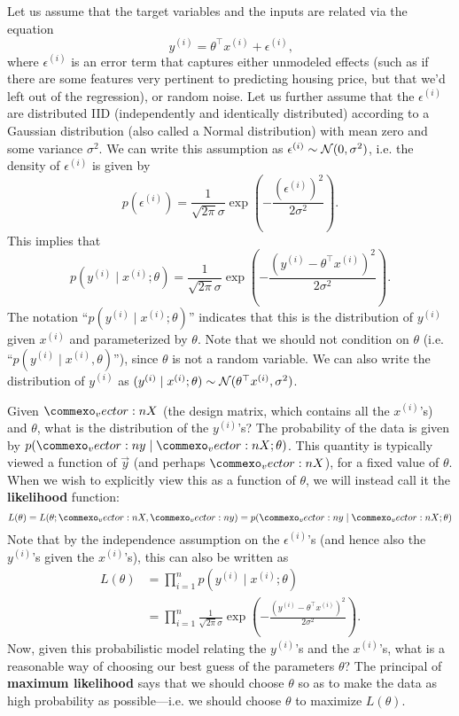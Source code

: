 Let us assume that the target variables and the inputs are related via the
equation
\begin{equation}
    y^{(i)} = \theta^\top x^{(i)} + \epsilon^{(i)}\text{,}
\end{equation}
where $\epsilon^{(i)}$ is an error term that captures either unmodeled effects (such as
if there are some features very pertinent to predicting housing price, but
that we'd left out of the regression), or random noise. Let us further assume
that the $\epsilon^{(i)}$ are distributed IID (independently and identically distributed)
according to a Gaussian distribution (also called a Normal distribution) with
mean zero and some variance $\sigma^2$. We can write this assumption as %
$\epsilon^{(i)} \sim \cal N(0, \sigma^2)$, i.e. the density of $\epsilon^{(i)}$ is given by
\begin{equation}
    p(\epsilon^{(i)}) = \frac{1}{\sqrt{2\pi}\sigma} \exp \left( - \frac{(\epsilon^{(i)})^2}{2\sigma^2} \right)\text{.}
\end{equation}
This implies that
\begin{equation}
    p(y^{(i)} \mid x^{(i)}; \theta) = \frac{1}{\sqrt{2\pi}\sigma} \exp \left( - \frac{(y^{(i)} - \theta^\top x^{(i)})^2}{2\sigma^2} \right)\text{.}
\end{equation}
The notation ``$p(y^{(i)} \mid x^{(i)}; \theta)$'' indicates that this is the distribution of $y^{(i)}$
given $x^{(i)}$ and parameterized by $\theta$. Note that we should not condition on $\theta$
(i.e. ``$p(y^{(i)} \mid x^{(i)}, \theta)$''), since $\theta$ is not a random variable. We can also write the
distribution of $y^{(i)}$ as $(y^{(i)} \mid x^{(i)}; \theta) \sim \cal N(\theta^\top x^{(i)}, \sigma^2)$. %

Given $\mat X$ (the design matrix, which contains all the $x^{(i)}$'s) and $\theta$, what
is the distribution of the $y^{(i)}$'s? The probability of the data is given by
$p(\vec y \mid \mat X; \theta)$. This quantity is typically viewed a function of $\vec y$ (and perhaps $\mat X$),
for a fixed value of $\theta$. When we wish to explicitly view this as a function of
$\theta$, we will instead call it the \textbf{likelihood} function:
\begin{equation}
    L(\theta) = L(\theta; \mat X, \vec y) = p(\vec y \mid \mat X; \theta) %
\end{equation}
Note that by the independence assumption on the $\epsilon^{(i)}$'s (and hence also the
$y^{(i)}$'s given the $x^{(i)}$'s), this can also be written as %
\begin{align}
    L(\theta) &= \prod_{i=1}^n p(y^{(i)} \mid x^{(i)}; \theta)\\
              &= \prod_{i=1}^n \frac{1}{\sqrt{2\pi}\sigma} \exp \left( - \frac{(y^{(i)} - \theta^\top x^{(i)})^2}{2\sigma^2} \right)\text{.}
\end{align}
Now, given this probabilistic model relating the $y^{(i)}$'s and the $x^{(i)}$'s, what
is a reasonable way of choosing our best guess of the parameters $\theta$? The
principal of \textbf{maximum likelihood} says that we should choose $\theta$ so as to
make the data as high probability as possible---i.e. we should choose $\theta$ to
maximize $L(\theta)$.

